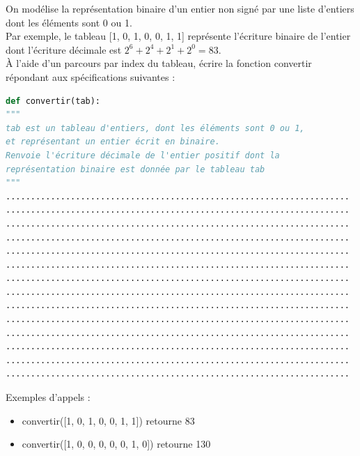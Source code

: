 \begin{Exercise}[title={Conversion binaire}]
On modélise la représentation binaire d'un entier non signé par une liste d'entiers dont les éléments sont 0 ou 1.\\
Par exemple, le tableau [1, 0, 1, 0, 0, 1, 1] représente
l'écriture binaire de l'entier dont l'écriture décimale est
$2^6 + 2^4 + 2^1 + 2^0 = 83$.\\
À l'aide d'un parcours par index du tableau, écrire la fonction convertir répondant aux spécifications suivantes :
\begin{lstlisting}[language=Python]
def convertir(tab):
"""
tab est un tableau d'entiers, dont les éléments sont 0 ou 1,
et représentant un entier écrit en binaire.
Renvoie l'écriture décimale de l'entier positif dont la
représentation binaire est donnée par le tableau tab
"""
.....................................................................
.....................................................................
.....................................................................
.....................................................................
.....................................................................
.....................................................................
.....................................................................
.....................................................................
.....................................................................
.....................................................................
.....................................................................
.....................................................................
.....................................................................
.....................................................................
\end{lstlisting}

Exemples d'appels :
\begin{itemize}
    \item convertir([1, 0, 1, 0, 0, 1, 1]) retourne 83
    \item convertir([1, 0, 0, 0, 0, 0, 1, 0]) retourne 130
\end{itemize}
\end{Exercise}

